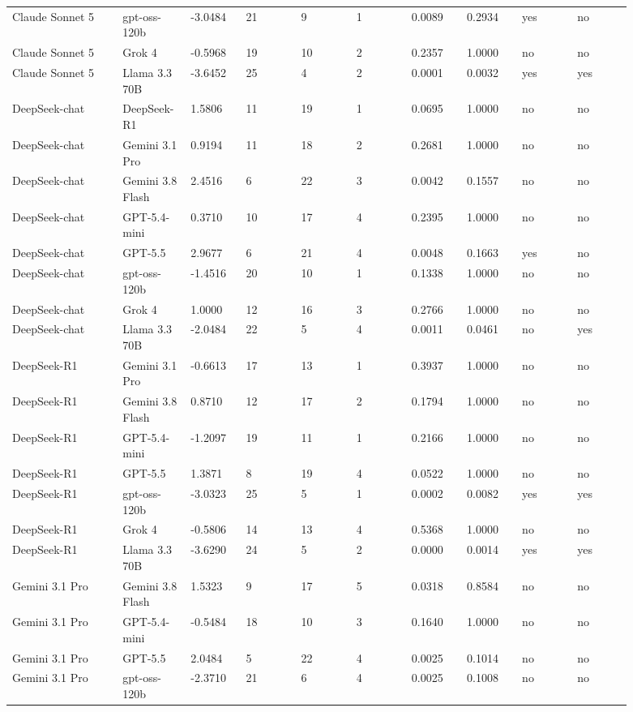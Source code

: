 \begin{landscape}
\begin{longtable}{p{0.162\linewidth}p{0.081\linewidth}p{0.081\linewidth}p{0.081\linewidth}p{0.081\linewidth}p{0.081\linewidth}p{0.081\linewidth}p{0.081\linewidth}p{0.081\linewidth}p{0.081\linewidth}}
Claude Sonnet 5 & gpt-oss-120b & -3.0484 & 21 & 9 & 1 & 0.0089 & 0.2934 & yes & no \\
Claude Sonnet 5 & Grok 4 & -0.5968 & 19 & 10 & 2 & 0.2357 & 1.0000 & no & no \\
Claude Sonnet 5 & Llama 3.3 70B & -3.6452 & 25 & 4 & 2 & 0.0001 & 0.0032 & yes & yes \\
DeepSeek-chat & DeepSeek-R1 & 1.5806 & 11 & 19 & 1 & 0.0695 & 1.0000 & no & no \\
DeepSeek-chat & Gemini 3.1 Pro & 0.9194 & 11 & 18 & 2 & 0.2681 & 1.0000 & no & no \\
DeepSeek-chat & Gemini 3.8 Flash & 2.4516 & 6 & 22 & 3 & 0.0042 & 0.1557 & no & no \\
DeepSeek-chat & GPT-5.4-mini & 0.3710 & 10 & 17 & 4 & 0.2395 & 1.0000 & no & no \\
DeepSeek-chat & GPT-5.5 & 2.9677 & 6 & 21 & 4 & 0.0048 & 0.1663 & yes & no \\
DeepSeek-chat & gpt-oss-120b & -1.4516 & 20 & 10 & 1 & 0.1338 & 1.0000 & no & no \\
DeepSeek-chat & Grok 4 & 1.0000 & 12 & 16 & 3 & 0.2766 & 1.0000 & no & no \\
DeepSeek-chat & Llama 3.3 70B & -2.0484 & 22 & 5 & 4 & 0.0011 & 0.0461 & no & yes \\
DeepSeek-R1 & Gemini 3.1 Pro & -0.6613 & 17 & 13 & 1 & 0.3937 & 1.0000 & no & no \\
DeepSeek-R1 & Gemini 3.8 Flash & 0.8710 & 12 & 17 & 2 & 0.1794 & 1.0000 & no & no \\
DeepSeek-R1 & GPT-5.4-mini & -1.2097 & 19 & 11 & 1 & 0.2166 & 1.0000 & no & no \\
DeepSeek-R1 & GPT-5.5 & 1.3871 & 8 & 19 & 4 & 0.0522 & 1.0000 & no & no \\
DeepSeek-R1 & gpt-oss-120b & -3.0323 & 25 & 5 & 1 & 0.0002 & 0.0082 & yes & yes \\
DeepSeek-R1 & Grok 4 & -0.5806 & 14 & 13 & 4 & 0.5368 & 1.0000 & no & no \\
DeepSeek-R1 & Llama 3.3 70B & -3.6290 & 24 & 5 & 2 & 0.0000 & 0.0014 & yes & yes \\
Gemini 3.1 Pro & Gemini 3.8 Flash & 1.5323 & 9 & 17 & 5 & 0.0318 & 0.8584 & no & no \\
Gemini 3.1 Pro & GPT-5.4-mini & -0.5484 & 18 & 10 & 3 & 0.1640 & 1.0000 & no & no \\
Gemini 3.1 Pro & GPT-5.5 & 2.0484 & 5 & 22 & 4 & 0.0025 & 0.1014 & no & no \\
Gemini 3.1 Pro & gpt-oss-120b & -2.3710 & 21 & 6 & 4 & 0.0025 & 0.1008 & no & no \\

\end{longtable}
\end{landscape}
